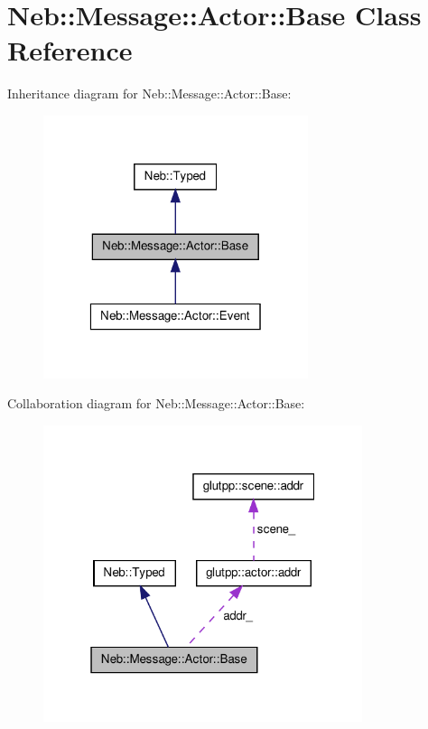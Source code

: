 \hypertarget{classNeb_1_1Message_1_1Actor_1_1Base}{\section{\-Neb\-:\-:\-Message\-:\-:\-Actor\-:\-:\-Base \-Class \-Reference}
\label{classNeb_1_1Message_1_1Actor_1_1Base}
}


\-Inheritance diagram for \-Neb\-:\-:\-Message\-:\-:\-Actor\-:\-:\-Base\-:
\nopagebreak
\begin{figure}[H]
\begin{center}
\leavevmode
\includegraphics[width=220pt]{classNeb_1_1Message_1_1Actor_1_1Base__inherit__graph}
\end{center}
\end{figure}


\-Collaboration diagram for \-Neb\-:\-:\-Message\-:\-:\-Actor\-:\-:\-Base\-:
\nopagebreak
\begin{figure}[H]
\begin{center}
\leavevmode
\includegraphics[width=265pt]{classNeb_1_1Message_1_1Actor_1_1Base__coll__graph}
\end{center}
\end{figure}
